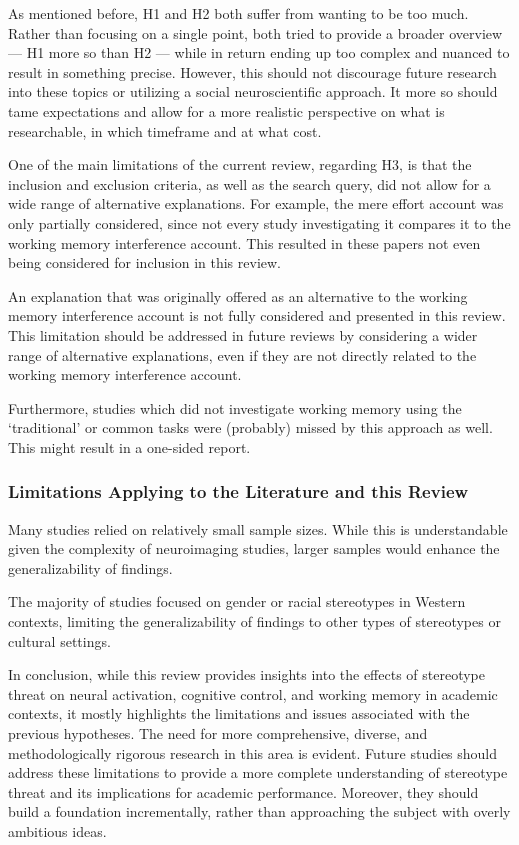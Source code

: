 \documentclass[
  stu, a4paper,floatsintext]{apa7}
\begin{document}
As mentioned before, H1 and H2 both suffer from wanting to be too much. Rather than focusing on a single point, both tried to provide a broader overview --- H1 more so than H2 --- while in return ending up too complex and nuanced to result in something precise. However, this should not discourage future research into these topics or utilizing a social neuroscientific approach. It more so should tame expectations and allow for a more realistic perspective on what is researchable, in which timeframe and at what cost.

One of the main limitations of the current review, regarding H3, is that the inclusion and exclusion criteria, as well as the search query, did not allow for a wide range of alternative explanations. For example, the mere effort account was only partially considered, since not every study investigating it compares it to the working memory interference account. This resulted in these papers not even being considered for inclusion in this review.

An explanation that was originally offered as an alternative to the working memory interference account is not fully considered and presented in this review. This limitation should be addressed in future reviews by considering a wider range of alternative explanations, even if they are not directly related to the working memory interference account.

Furthermore, studies which did not investigate working memory using the `traditional' or common tasks were (probably) missed by this approach as well. This might result in a one-sided report.

\subsubsection{Limitations Applying to the Literature and this Review}\label{limitations-applying-to-the-literature-and-this-review}

Many studies relied on relatively small sample sizes. While this is understandable given the complexity of neuroimaging studies, larger samples would enhance the generalizability of findings.

The majority of studies focused on gender or racial stereotypes in Western contexts, limiting the generalizability of findings to other types of stereotypes or cultural settings.

In conclusion, while this review provides insights into the effects of stereotype threat on neural activation, cognitive control, and working memory in academic contexts, it mostly highlights the limitations and issues associated with the previous hypotheses. The need for more comprehensive, diverse, and methodologically rigorous research in this area is evident. Future studies should address these limitations to provide a more complete understanding of stereotype threat and its implications for academic performance. Moreover, they should build a foundation incrementally, rather than approaching the subject with overly ambitious ideas.
\end{document}
